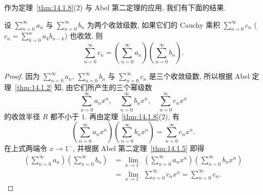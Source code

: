 作为定理~\ref{thm:14.1.8}(2) 与 Abel 第二定理的应用, 我们有下面的结果.

\begin{theorem}\label{thm:14.1.9}
设 $\sum_{n=0}^{\infty}a_{n}$ 与 $\sum_{n=0}^{\infty}b_{n}$ 为两个收敛级数, 如果它们的 Cauchy 乘积 $\sum_{n=0}^{\infty}c_{n}$ ($c_{n}=\sum_{k=0}^{n}a_{k}b_{n-k}$) 也收敛, 则
\[
  \sum_{n=0}^{\infty}c_{n}=\left(\sum_{n=0}^{\infty}a_{n}\right)\left(\sum_{n=0}^{\infty}b_{n}\right).
\]
\end{theorem}

\begin{proof}
因为 $\sum_{n=0}^{\infty}a_{n}$, $\sum_{n=0}^{\infty}b_{n}$ 与 $\sum_{n=0}^{\infty}c_{n}$ 是三个收敛级数, 所以根据 Abel 定理~\ref{thm:14.1.2} 知, 由它们所产生的三个幂级数
\[
  \sum_{n=0}^{\infty}a_{n}x^{n},\quad\sum_{n=0}^{\infty}b_{n}x^{n},\quad\sum_{n=0}^{\infty}c_{n}x^{n}
\]
的收敛半径 $R$ 都不小于 $1$. 再由定理~\ref{thm:14.1.8}(2), 有
\[
  \left(\sum_{n=0}^{\infty}a_{n}x^{n}\right)\left(\sum_{n=0}^{\infty}b_{n}x^{n}\right)=\sum_{n=0}^{\infty}c_{n}x^{n}.
\]
在上式两端令 $x\to1^{-}$, 并根据 Abel 第二定理~\ref{thm:14.1.5} 即得
\[
  \begin{aligned}
    \left(\sum_{n=0}^{\infty}a_{n}\right)\left(\sum_{n=0}^{\infty}b_{n}\right)&=\lim_{x\to1^{-}}\left(\sum_{n=0}^{\infty}a_{n}x^{n}\right)\left(\sum_{n=0}^{\infty}b_{n}x^{n}\right)\\
    &=\lim_{x\to1^{-}}\sum_{n=0}^{\infty}c_{n}x^{n}=\sum_{n=0}^{\infty}c_{n}.
  \end{aligned}
\]
\end{proof}

